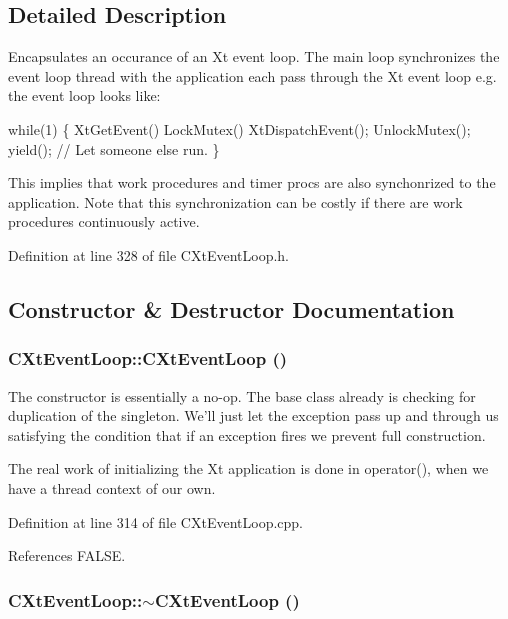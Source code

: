 \subsection{Detailed Description}
Encapsulates an occurance of an Xt event loop.  The main loop synchronizes the event loop thread with the application each pass through the  Xt event loop e.g. the event loop looks like:

while(1) \{ Xt\-Get\-Event() Lock\-Mutex() Xt\-Dispatch\-Event(); Unlock\-Mutex(); yield(); // Let someone else run. \}

This implies that work procedures and timer procs are also synchonrized to the application. Note that this synchronization can be costly if there are work procedures continuously active. 



Definition at line 328 of file CXt\-Event\-Loop.h.

\subsection{Constructor \& Destructor Documentation}
\subsubsection{\setlength{\rightskip}{0pt plus 5cm}CXt\-Event\-Loop::CXt\-Event\-Loop ()}\label{classCXtEventLoop_a0}


The constructor is essentially a no-op. The base class already is checking for duplication of the singleton. We'll just let the exception pass up and through us  satisfying the condition that if an exception fires we prevent full construction.

The real work of initializing the Xt application is done in operator(), when we have a thread context of our own. 

Definition at line 314 of file CXt\-Event\-Loop.cpp.

References FALSE.
\subsubsection{\setlength{\rightskip}{0pt plus 5cm}CXt\-Event\-Loop::$\sim$CXt\-Event\-Loop ()\hspace{0.3cm}{\tt  [virtual]}}\label{classCXtEventLoop_a1}


